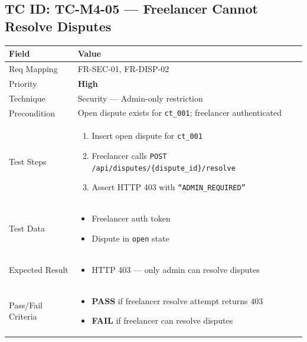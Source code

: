 \documentclass[12pt,a4paper]{article}
\newcommand{\sevhigh}{\textcolor{severityhigh}{\textbf{High}}}
\newcommand{\passresult}{\textcolor{passgreen}{\textbf{PASS}}}
\newcommand{\failresult}{\textcolor{failred}{\textbf{FAIL}}}
\begin{document}
\vspace{0.8cm}

\subsection{TC ID: TC-M4-05 --- Freelancer Cannot Resolve Disputes}

\begin{tabular}{|p{}|p{}|}
\hline
\rowcolor{lightblue} \textbf{Field} & \textbf{Value} \\
\hline
Req Mapping & FR-SEC-01, FR-DISP-02 \\
\hline
Priority & \sevhigh \\
\hline
Technique & Security --- Admin-only restriction \\
\hline
Precondition & Open dispute exists for \texttt{ct\_001}; freelancer authenticated \\
\hline
Test Steps &
\begin{enumerate}[nosep, leftmargin=*]
  \item Insert open dispute for \texttt{ct\_001}
  \item Freelancer calls \texttt{POST /api/disputes/\{dispute\_id\}/resolve}
  \item Assert HTTP 403 with \texttt{``ADMIN\_REQUIRED''}
\end{enumerate} \\
\hline
Test Data &
\begin{itemize}[nosep, leftmargin=*]
  \item Freelancer auth token
  \item Dispute in \texttt{open} state
\end{itemize} \\
\hline
Expected Result &
\begin{itemize}[nosep, leftmargin=*]
  \item HTTP 403 --- only admin can resolve disputes
\end{itemize} \\
\hline
Pass/Fail Criteria &
\begin{itemize}[nosep, leftmargin=*]
  \item \passresult{} if freelancer resolve attempt returns 403
  \item \failresult{} if freelancer can resolve disputes
\end{itemize} \\
\hline
\end{tabular}
\end{document}

